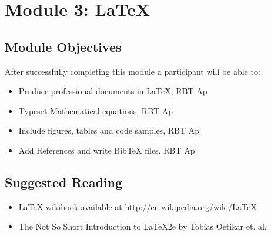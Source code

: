 \documentclass{article}
\begin{document}
\section{Module 3: LaTeX}
\label{LaTeX}
\subsection{Module Objectives}
After successfully completing this module a participant will be able to:
	\begin{itemize}
	\item Produce professional documents in LaTeX, \hfill RBT Ap
        \item Typeset Mathematical equations, \hfill  RBT Ap
        \item Include figures, tables and code samples, \hfill RBT Ap
        \item Add References and write BibTeX files. \hfill RBT Ap
\end{itemize}
\subsection{Suggested Reading}
\begin{itemize}
    \item LaTeX wikibook available at http://en.wikipedia.org/wiki/LaTeX 
    \item The Not So Short Introduction to LaTeX2e by Tobias Oetikar et. al.
\end{itemize}
\end{document}
